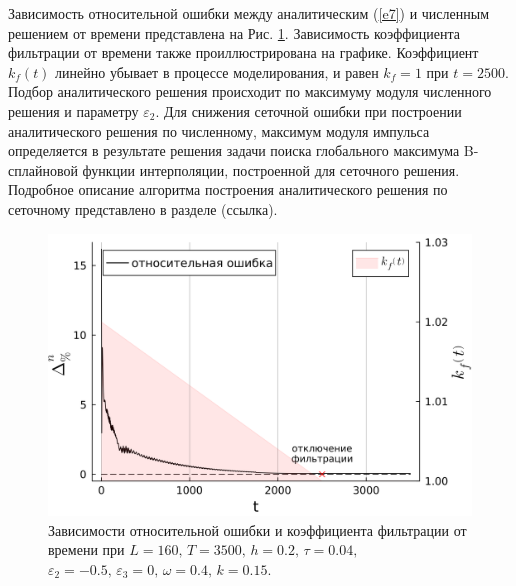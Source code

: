 \documentclass[14pt,a4paper]{extreport}
\begin{document}
			Зависимость относительной ошибки между аналитическим (\ref{e7}) и численным решением от времени представлена на Рис. \ref{fig21_2}. Зависимость коэффициента фильтрации от времени также проиллюстрирована на графике. Коэффициент \(k_{f}\left(t\right)\) линейно убывает в процессе моделирования, и равен \(k_{f}=1\) при \(t=2500\). Подбор аналитического решения происходит по максимуму модуля численного решения и параметру \(\varepsilon_{2}\). Для снижения сеточной ошибки при построении аналитического решения по численному, максимум модуля импульса определяется в результате решения задачи поиска глобального максимума B-сплайновой функции интерполяции, построенной для сеточного решения. Подробное описание алгоритма построения аналитического решения по сеточному представлено в разделе (ссылка).

			\begin{figure}[H]
				\begin{center}
					\includegraphics[width=0.7\linewidth]{Medvedev_fig18.png}
				\end{center}
				\caption{Зависимости относительной ошибки и коэффициента фильтрации от времени при
				\(L=160,\, T=3500,\, h=0.2,\, \tau=0.04,\)
				\(\varepsilon_{2}=-0.5,\,\varepsilon_{3}=0,\, \omega=0.4,\, k=0.15\).}
				\label{fig21_2}
			\end{figure}
\end{document}
